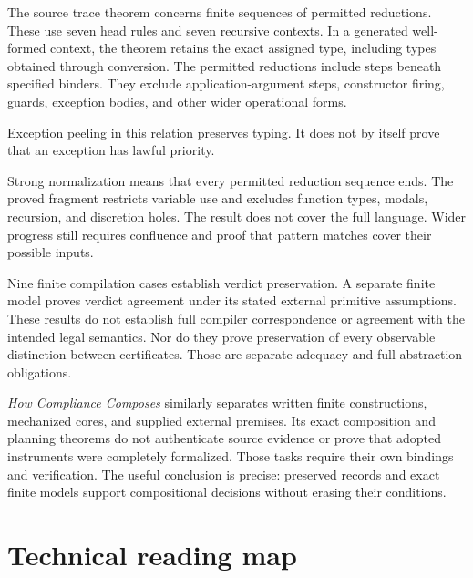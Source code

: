 \documentclass{momentum}
\begin{document}
The source trace theorem concerns finite sequences of permitted reductions. These use seven head rules and seven recursive contexts. In a generated well-formed context, the theorem retains the exact assigned type, including types obtained through conversion. The permitted reductions include steps beneath specified binders. They exclude application-argument steps, constructor firing, guards, exception bodies, and other wider operational forms.

Exception peeling in this relation preserves typing. It does not by itself prove that an exception has lawful priority. \cite[Section~4.2, Source trace preservation]{lex}

Strong normalization means that every permitted reduction sequence ends. The proved fragment restricts variable use and excludes function types, modals, recursion, and discretion holes. The result does not cover the full language. Wider progress still requires confluence and proof that pattern matches cover their possible inputs.

Nine finite compilation cases establish verdict preservation. A separate finite model proves verdict agreement under its stated external primitive assumptions. These results do not establish full compiler correspondence or agreement with the intended legal semantics. Nor do they prove preservation of every observable distinction between certificates. Those are separate adequacy and full-abstraction obligations. \cite[Sections~5--5.1 and~11--12]{lex}

\emph{How Compliance Composes} similarly separates written finite constructions, mechanized cores, and supplied external premises. Its exact composition and planning theorems do not authenticate source evidence or prove that adopted instruments were completely formalized. Those tasks require their own bindings and verification. The useful conclusion is precise: preserved records and exact finite models support compositional decisions without erasing their conditions. \cite[Sections~10--11]{composes}

\section{Technical reading map}
\end{document}
